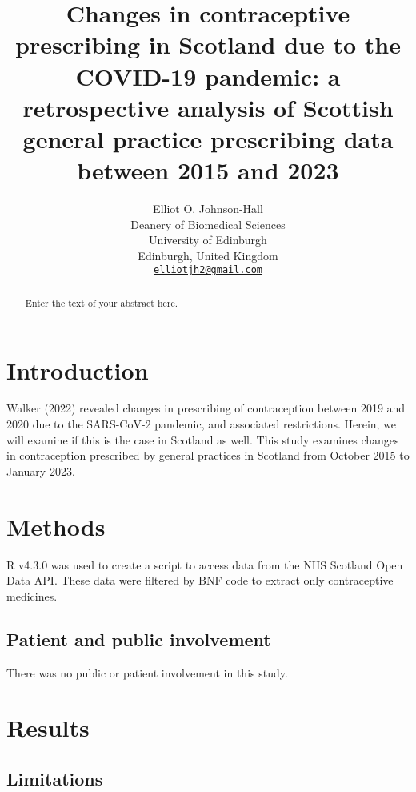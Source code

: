 \documentclass{article}
\title{Changes in contraceptive prescribing in Scotland due to the
COVID-19 pandemic: a retrospective analysis of Scottish general practice
prescribing data between 2015 and 2023}
\author{
    Elliot O. Johnson-Hall
   \\
    Deanery of Biomedical Sciences \\
    University of Edinburgh \\
  Edinburgh, United Kingdom \\
  \texttt{\href{mailto:elliotjh2@gmail.com}{\nolinkurl{elliotjh2@gmail.com}}} \\
  }
\begin{document}
\maketitle


\begin{abstract}
Enter the text of your abstract here.
\end{abstract}


\hypertarget{introduction}{%
\section{Introduction}\label{introduction}}

Walker (2022) revealed changes in prescribing of contraception between
2019 and 2020 due to the SARS-CoV-2 pandemic, and associated
restrictions. Herein, we will examine if this is the case in Scotland as
well. This study examines changes in contraception prescribed by general
practices in Scotland from October 2015 to January 2023.

\hypertarget{methods}{%
\section{Methods}\label{methods}}

R v4.3.0 was used to create a script to access data from the NHS
Scotland Open Data API. These data were filtered by BNF code to extract
only contraceptive medicines.

\hypertarget{patient-and-public-involvement}{%
\subsection{Patient and public
involvement}\label{patient-and-public-involvement}}

There was no public or patient involvement in this study.

\hypertarget{results}{%
\section{Results}\label{results}}

\hypertarget{limitations}{%
\subsection{Limitations}\label{limitations}}
\end{document}
